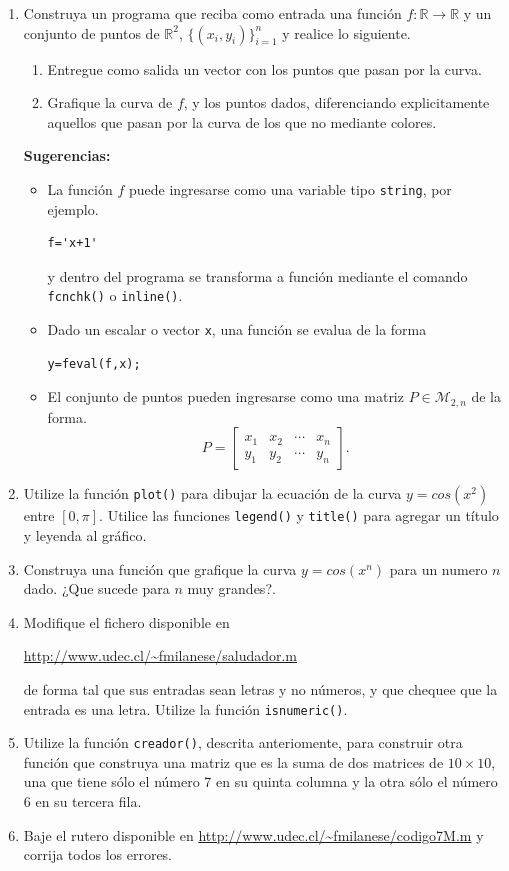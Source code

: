\documentclass[11pt]{article}
\begin{document}
\begin{enumerate}
\item Construya un programa que reciba como entrada una funci\'on $f: \mathbb{R}\to\mathbb{R}$ y un conjunto de puntos de $\mathbb{R}^2$, $\{(x_i,y_i)\}_{i=1}^n$ y realice lo siguiente.
\begin{enumerate}
\item Entregue como salida un vector con los puntos que pasan por la curva.
\item Grafique la curva de $f$, y los puntos dados, diferenciando explicitamente aquellos que pasan por la curva de los que no mediante colores.
\end{enumerate}
\textbf{Sugerencias:}
\begin{itemize}
\item La funci\'on $f$ puede ingresarse como una variable tipo \texttt{string}, por ejemplo.
\begin{verbatim}
f='x+1'
\end{verbatim}
y dentro del programa se transforma a funci\'on mediante el comando \texttt{fcnchk()} o \texttt{inline()}. 
\item Dado un escalar o vector \texttt{x}, una funci\'on se evalua de la forma
\begin{verbatim}
y=feval(f,x);
\end{verbatim}
\item El conjunto de puntos pueden ingresarse como una matriz $P\in \mathcal{M}_{2,n}$ de la forma.
$$P=\begin{bmatrix}
x_1 & x_2 & \cdots & x_n \\
y_1 & y_2 & \cdots & y_n 
\end{bmatrix}.
$$
\end{itemize}

   \item Utilize la funci\'on \texttt{plot()} para dibujar la ecuaci\'on de la curva $y=cos(x^2)$ entre $[0,\pi]$.  Utilice las funciones \texttt{legend()} y \texttt{title()} para agregar un t\'itulo y leyenda al gr\'afico.
   
   \item Construya una funci\'on que grafique la curva $y=cos(x^n)$ para un numero $n$ dado. ¿Que sucede para $n$ muy grandes?.
   
   \item Modifique el fichero disponible en 
   
   \url{http://www.udec.cl/~fmilanese/saludador.m}
   
  de forma tal que sus entradas sean letras y no n\'umeros, y que chequee que la entrada es una letra. Utilize la funci\'on \texttt{isnumeric()}.
    \item Utilize la funci\'on \texttt{creador()}, descrita anteriomente, para construir otra funci\'on que construya una matriz que es la suma de dos matrices de $10\times 10$, una que tiene sólo el n\'umero 7 en su quinta columna y la otra s\'olo el n\'umero 6 en su tercera fila.
    \item Baje el rutero disponible en \url{http://www.udec.cl/~fmilanese/codigo7M.m} y corrija todos los errores.

  \end{enumerate}
\end{document}
